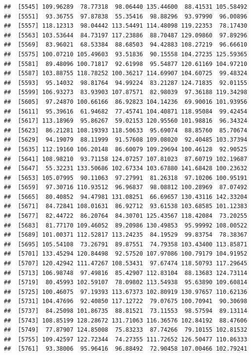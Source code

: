 \documentclass[
]{article}
\begin{document}
\begin{verbatim}
##  [5545] 109.96289  78.77318  98.06440 135.44600  88.41531 105.58492
##  [5551]  93.36755  97.87838  55.35416  98.88296  93.97990  96.00896
##  [5557] 118.12313  98.04442 113.54491 114.48098 119.22353  78.17430
##  [5563] 103.53644  84.73197 117.23886  88.70487 129.09860  97.89296
##  [5569]  83.96021  68.53384  88.68503  94.42883 108.27219  96.66610
##  [5575] 100.07210 105.49603  93.51836  90.15558 104.27235 125.59365
##  [5581]  89.48096 100.71817  92.61998  95.54877 120.61169 104.97210
##  [5587] 103.88755 118.78252 100.36217 114.69907 104.60725  99.48324
##  [5593]  95.14032  98.81764  94.99224  83.21287 124.71835  92.01155
##  [5599] 106.93273  83.93903 107.87571  82.98039  97.36188 119.34298
##  [5605]  97.24870 100.66166  86.92823 104.14236  69.90016 101.93956
##  [5611]  95.39616  61.94682  77.45741 104.40871 118.95084  99.42454
##  [5617] 113.18969  95.86267  59.02153 120.95560 101.98816  96.34324
##  [5623]  86.21281 108.19393 118.50633  95.69074  88.85760  85.70674
##  [5629]  94.19079  88.11999  91.57608 109.08020  92.40485 103.37394
##  [5635] 112.19160 106.20148  86.60079 109.29694 100.46128  92.90525
##  [5641] 108.98210  93.71158 124.07257 107.81023  87.60719 102.19687
##  [5647]  55.32231 133.50686 102.67334 103.67880 141.68428 100.23632
##  [5653] 105.07995  90.11063  97.27991  81.26318  97.10206 100.95191
##  [5659]  97.30716 110.93512  96.96837  98.08812 100.28969  87.07492
##  [5665]  80.40852  94.47981 131.08251  66.69657 130.43116 142.33204
##  [5671]  84.72841 108.01631  86.92712  93.61538 103.68585 101.12383
##  [5677]  82.44722  86.20764  84.30701 125.43567 118.42084  73.20255
##  [5683]  81.77170 109.46052  89.20986 130.49853  95.99992 108.00522
##  [5689] 101.00371 112.52817 113.24235  84.19529  99.83754  78.38367
##  [5695] 105.54108  73.26791  89.87551  74.79358 103.43400 113.85871
##  [5701] 133.45294 120.84498  92.57520 107.97086 100.79179 104.91952
##  [5707] 120.42942 111.47267 108.53431  97.67474 118.50793 117.29645
##  [5713] 106.98748  97.49816  85.42907 112.83104  88.13683 124.73114
##  [5719]  80.45993 102.59107  78.09802 113.54938  95.63890 109.60814
##  [5725] 100.46075  97.19393 113.67373 102.80919 130.97657 110.62136
##  [5731] 104.47696  92.40850 117.12722  79.07675 100.70941  90.30698
##  [5737]  84.25098 101.86735  88.81521  73.11553  98.57594  89.13114
##  [5743] 108.85199 128.28672 131.71063 116.36576 102.84192  88.47606
##  [5749]  77.87907 124.85008  75.83233  87.74266  79.10155 102.81532
##  [5755] 109.42597 122.72344  74.27355 111.72652 126.50477 110.86333
##  [5761]  93.38006  95.96416  96.88492  72.90458 107.00466 102.79241

\end{verbatim}
\end{document}
